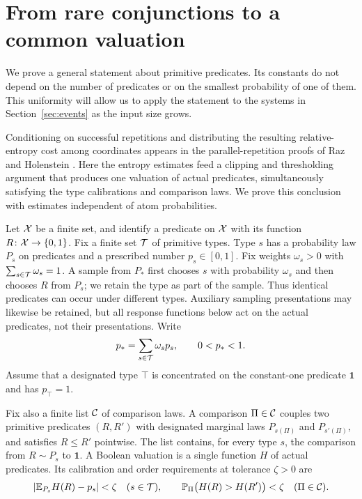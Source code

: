 \section{From rare conjunctions to a common valuation}
\label{sec:entropy}

We prove a general statement about primitive predicates.  Its constants do
not depend on the number of predicates or on the smallest probability of
one of them.  This uniformity will allow us to apply the statement to the
systems in Section~\ref{sec:events} as the input size grows.

Conditioning on successful repetitions and distributing the resulting
relative-entropy cost among coordinates appears in the parallel-repetition
proofs of Raz \cite{Raz1998} and Holenstein
\cite[Section~4]{Holenstein2009}. Here the entropy estimates feed a clipping
and thresholding argument that produces one valuation of actual predicates,
simultaneously satisfying the type calibrations and comparison laws.
We prove this conclusion with estimates independent of atom probabilities.

Let $\mathcal X$ be a finite set, and identify a predicate on $\mathcal X$ with its
function $R\colon\mathcal X\to\{0,1\}$.  Fix a finite set $\mathcal T$ of primitive
types.  Type $s$ has a probability law $P_s$ on predicates and a prescribed
number $p_s\in[0,1]$.  Fix weights $\omega_s>0$ with
$\sum_{s\in\mathcal T}\omega_s=1$.  A sample from $P_*$ first chooses $s$ with
probability $\omega_s$ and then chooses $R$ from $P_s$; we retain the type
as part of the sample.  Thus identical predicates can occur under different
types.  Auxiliary sampling presentations may likewise be retained, but all
response functions below act on the actual predicates, not their
presentations.  Write
\[
 p_* = \sum_{s\in\mathcal T}\omega_s p_s,
 \qquad 0<p_*<1.
\]
Assume that a designated type $\top$ is concentrated on the constant-one
predicate $\mathbf 1$ and has $p_\top=1$.

Fix also a finite list $\mathcal C$ of comparison laws.  A comparison
$\Pi\in\mathcal C$ couples two primitive predicates $(R,R')$ with designated
marginal laws $P_{s(\Pi)}$ and $P_{s'(\Pi)}$, and satisfies $R\le R'$
pointwise.  The list contains, for every type $s$, the comparison from
$R\sim P_s$ to $\mathbf 1$.  A Boolean valuation is a single function $H$
of actual predicates.  Its calibration and order requirements at tolerance
$\zeta>0$ are
\begin{equation}
 \label{eq:entropy-valuation-target}
 \lvert\mathbb E_{P_s}H(R)-p_s\rvert<\zeta
 \quad(s\in\mathcal T),
 \qquad
 \mathbb P_{\Pi}\bigl(H(R)>H(R')\bigr)<\zeta
 \quad(\Pi\in\mathcal C).
\end{equation}

